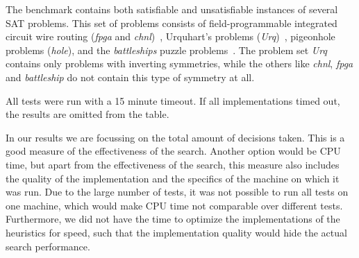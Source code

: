 	The benchmark contains both satisfiable and unsatisfiable instances of several SAT problems.
	This set of problems consists of field-programmable integrated circuit wire routing (\emph{fpga} and
	\emph{chnl})~\cite{nam2004comparative}, Urquhart's problems (\emph{Urq})~\cite{urquhart1987hard},
	pigeonhole problems (\emph{hole}), and the \emph{battleships}
	puzzle problems~\cite{sevenster2004battleships}.
	The problem set \emph{Urq} contains only problems with inverting symmetries, while the
	others like \emph{chnl}, \emph{fpga} and \emph{battleship} do not contain this type of symmetry
	at all\cite{devriendt2012symmetry}.

	All tests were run with a 15 minute timeout.
	If all implementations timed out, the results are omitted from the table.

	In our results we are focussing on the total amount of decisions taken.
	This is a good measure of the effectiveness of the search.
	Another option would be CPU time, but apart from the effectiveness of the search, this measure
	also includes the quality of the implementation and the specifics of the machine on which it was
	run.
	Due to the large number of tests, it was not possible to run all tests on one machine, which
	would make CPU time not comparable over different tests.
	Furthermore, we did not have the time to optimize the implementations of the heuristics for
	speed, such that the implementation quality would hide the actual search performance.
